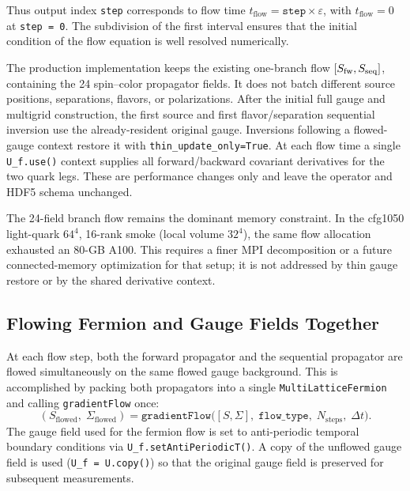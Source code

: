 \documentclass[11pt,a4paper]{article}
\newcommand{\seqprop}{\Sigma}
\newcommand{\fwprop}{S}
\newcommand{\code}[1]{\texttt{#1}}
\begin{document}
Thus output index \texttt{step} corresponds to flow time $t_{\text{flow}} =
\texttt{step} \times \varepsilon$, with $t_{\text{flow}} = 0$ at
\texttt{step = 0}.  The subdivision of the first interval ensures that the initial
condition of the flow equation is well resolved numerically.

The production implementation keeps the existing one-branch flow
\([S_{\rm fw},S_{\rm seq}]\), containing the 24 spin--color propagator
fields.  It does not batch different source positions, separations, flavors,
or polarizations.  After the initial full gauge and multigrid construction,
the first source and first flavor/separation sequential inversion use the
already-resident original gauge.  Inversions following a flowed-gauge context
restore it with \code{thin\_update\_only=True}.  At each flow time a single
\code{U\_f.use()} context supplies all forward/backward covariant derivatives
for the two quark legs.  These are performance changes only and leave the
operator and HDF5 schema unchanged.

The 24-field branch flow remains the dominant memory constraint.  In the
cfg1050 light-quark $64^4$, 16-rank smoke (local volume $32^4$), the same
flow allocation exhausted an 80-GB A100.  This requires a finer MPI
decomposition or a future connected-memory optimization for that setup; it is
not addressed by thin gauge restore or by the shared derivative context.

\subsection{Flowing Fermion and Gauge Fields Together}

At each flow step, both the forward propagator and the sequential propagator are
flowed simultaneously on the same flowed gauge background.  This is accomplished
by packing both propagators into a single \texttt{MultiLatticeFermion} and calling
\texttt{gradientFlow} once:
\begin{equation}
  (\fwprop_{\text{flowed}},\;\seqprop_{\text{flowed}})
  = \texttt{gradientFlow}\big([\fwprop,\seqprop],\;
    \texttt{flow\_type},\;N_{\text{steps}},\;\Delta t\big).
\end{equation}
The gauge field used for the fermion flow is set to anti-periodic temporal boundary
conditions via \texttt{U\_f.setAntiPeriodicT()}.  A copy of the unflowed gauge
field is used (\texttt{U\_f = U.copy()}) so that the original gauge field is
preserved for subsequent measurements.
\end{document}
